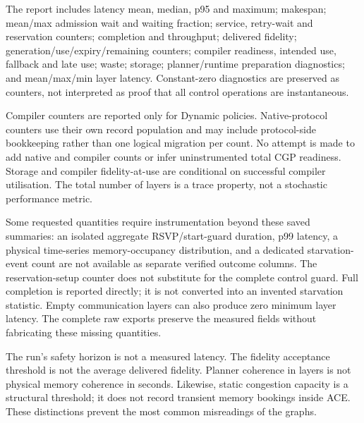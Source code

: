 \documentclass[10pt,a4paper,oneside]{report}
\begin{document}
The report includes latency mean, median, p95 and maximum; makespan; mean/max admission wait and waiting fraction; service, retry-wait and reservation counters; completion and throughput; delivered fidelity; generation/use/expiry/remaining counters; compiler readiness, intended use, fallback and late use; waste; storage; planner/runtime preparation diagnostics; and mean/max/min layer latency. Constant-zero diagnostics are preserved as counters, not interpreted as proof that all control operations are instantaneous.

Compiler counters are reported only for Dynamic policies. Native-protocol counters use their own record population and may include protocol-side bookkeeping rather than one logical migration per count. No attempt is made to add native and compiler counts or infer uninstrumented total CGP readiness. Storage and compiler fidelity-at-use are conditional on successful compiler utilisation. The total number of layers is a trace property, not a stochastic performance metric.

Some requested quantities require instrumentation beyond these saved summaries: an isolated aggregate RSVP/start-guard duration, p99 latency, a physical time-series memory-occupancy distribution, and a dedicated starvation-event count are not available as separate verified outcome columns. The reservation-setup counter does not substitute for the complete control guard. Full completion is reported directly; it is not converted into an invented starvation statistic. Empty communication layers can also produce zero minimum layer latency. The complete raw exports preserve the measured fields without fabricating these missing quantities.

The run's safety horizon is not a measured latency. The fidelity acceptance threshold is not the average delivered fidelity. Planner coherence in layers is not physical memory coherence in seconds. Likewise, static congestion capacity is a structural threshold; it does not record transient memory bookings inside ACE. These distinctions prevent the most common misreadings of the graphs.
\end{document}
